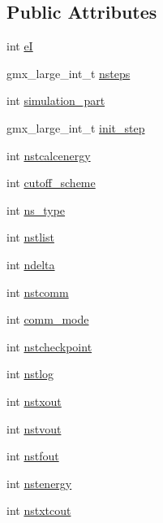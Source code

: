 \subsection*{\-Public \-Attributes}
\begin{DoxyCompactItemize}
\item 
int \hyperlink{structt__inputrec_a389ed9a5e63805585668bbf38bc84c1b}{e\-I}
\item 
gmx\-\_\-large\-\_\-int\-\_\-t \hyperlink{structt__inputrec_ae60358aa0e062512e664d8630c55fa44}{nsteps}
\item 
int \hyperlink{structt__inputrec_a03cc29dc069c642d8b88f1f4ee466376}{simulation\-\_\-part}
\item 
gmx\-\_\-large\-\_\-int\-\_\-t \hyperlink{structt__inputrec_ab7daa4fec406ada8dec5dfab76a5584e}{init\-\_\-step}
\item 
int \hyperlink{structt__inputrec_a9ddc5db5174906a3d84f3000f70ac66b}{nstcalcenergy}
\item 
int \hyperlink{structt__inputrec_a78f1ffb00f8bde219b9a62e26ae12be4}{cutoff\-\_\-scheme}
\item 
int \hyperlink{structt__inputrec_aee80bf28b9257159e3d98929e59e0136}{ns\-\_\-type}
\item 
int \hyperlink{structt__inputrec_a07ec6385c5fc66b31de408cbecbd14b7}{nstlist}
\item 
int \hyperlink{structt__inputrec_abcf139a4873f7fcafe3d5e477a623d7a}{ndelta}
\item 
int \hyperlink{structt__inputrec_a38278a32856e1d7640f46b1a663e37d1}{nstcomm}
\item 
int \hyperlink{structt__inputrec_aca45383accb97cced4714d7c36a1d18f}{comm\-\_\-mode}
\item 
int \hyperlink{structt__inputrec_afeb3d9ce76818223c5599c50ef89ccba}{nstcheckpoint}
\item 
int \hyperlink{structt__inputrec_adae9e5110c582534c7a0b09e02e6530e}{nstlog}
\item 
int \hyperlink{structt__inputrec_a069e86df70ed4bda38af690c4cd6c7e6}{nstxout}
\item 
int \hyperlink{structt__inputrec_a87cca907e56e05979f8bef77f12f08f1}{nstvout}
\item 
int \hyperlink{structt__inputrec_af5b220e74b7163b04e62c92881e9aa20}{nstfout}
\item 
int \hyperlink{structt__inputrec_a7ea930286abceee4389f0e72d07de3a5}{nstenergy}
\item 
int \hyperlink{structt__inputrec_a55def79c78490cb6e9ef2c6fc2815b15}{nstxtcout}

\end{DoxyCompactItemize}
